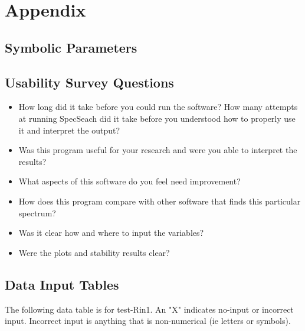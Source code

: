 \documentclass[12pt, titlepage]{article}
\begin{document}

\newpage

\section{Appendix}

\subsection{Symbolic Parameters}

\subsection{Usability Survey Questions}

\begin{itemize}
	\item How long did it take before you could run the software? How many 
	attempts at running SpecSeach did it take before you understood how to 
	properly use it and interpret the output?
	\item Was this program useful for your research and were you able to 
	interpret the results? 
	\item What aspects of this software do you feel need improvement?
	\item How does this program compare with other software that finds this 
	particular spectrum? 
	\item Was it clear how and where to input the variables? 
	\item Were the plots and stability results clear? 
\end{itemize} 

\newpage
\subsection{Data Input Tables} 

The following data table is for test-Rin1. An "X" indicates no-input or 
incorrect input. Incorrect input is anything that is non-numerical (ie letters 
or symbols). 
\end{document}
